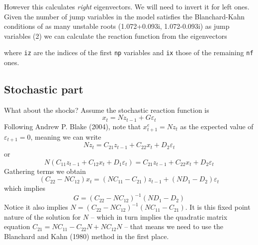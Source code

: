 \documentclass[
  letterpaper,
]{book}
\newenvironment{Shaded}{\begin{snugshade}}{\end{snugshade}}
\newcommand{\CommentTok}[1]{\textcolor[rgb]{0.37,0.37,0.37}{#1}}
\newcommand{\DecValTok}[1]{\textcolor[rgb]{0.68,0.00,0.00}{#1}}
\newcommand{\FunctionTok}[1]{\textcolor[rgb]{0.28,0.35,0.67}{#1}}
\newcommand{\NormalTok}[1]{\textcolor[rgb]{0.00,0.23,0.31}{#1}}
\newcommand{\OtherTok}[1]{\textcolor[rgb]{0.00,0.23,0.31}{#1}}
\newcommand{\SpecialCharTok}[1]{\textcolor[rgb]{0.37,0.37,0.37}{#1}}
\begin{document}
However this calculates \emph{right} eigenvectors. We will need to
invert it for left ones. Given the number of jump variables in the model
satisfies the Blanchard-Kahn conditions
of as many unstable roots (1.072+0.093i, 1.072-0.093i) as jump variables
(2) we can calculate the reaction function from the eigenvectors

\begin{Shaded}
\end{Shaded}

where \texttt{iz} are the indices of the first \texttt{np} variables and
\texttt{ix} those of the remaining \texttt{nf} ones.

\hypertarget{stochastic-part}{%
\subsection{Stochastic part}\label{stochastic-part}}

What about the shocks? Assume the stochastic reaction function is \[
  x_t = N z_{t-1} + G \varepsilon_t 
\] Following Andrew P. Blake (2004), note that \(x_{t+1}^e = N z_t\) as
the expected value of \(\varepsilon_{t+1}=0\), meaning we can write \[
 Nz_t = C_{21}z_{t-1} + C_{22} x_t + D_2 \varepsilon_t
\] or \[
 N\left( C_{11}z_{t-1} + C_{12}x_t + D_1 \varepsilon_t\right) = C_{21}z_{t-1} + C_{22} x_t + D_2 \varepsilon_t
\] Gathering terms we obtain \[
  (C_{22} - N C_{12}) x_t = (NC_{11} - C_{21}) z_{t-1} + (N D_1 - D_2) \varepsilon_t
\] which implies \[
G=(C_{22} - N C_{12})^{-1}(N D_1 - D_2) 
\] Notice it also implies
\(N = (C_{22} - N C_{12})^{-1}(NC_{11} - C_{21})\). It is this fixed
point nature of the solution for \(N\) -- which in turn implies the
quadratic matrix equation \(C_{21} = NC_{11} - C_{22}N + N C_{12}N\) --
that means we need to use the Blanchard and Kahn
(1980) method in the first place.
\end{document}
